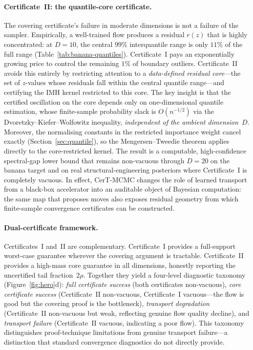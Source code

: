 \documentclass[12pt]{article}
\begin{document}
\paragraph{Certificate~II: the quantile-core certificate.}
The covering certificate's failure in moderate dimensions is not a failure of the sampler.
Empirically, a well-trained flow produces a residual $r(z)$ that is highly concentrated: at $D = 10$, the central $99\%$ interquantile range is only $11\%$ of the full range (Table~\ref{tab:banana-quantiles}).
Certificate~I pays an exponentially growing price to control the remaining $1\%$ of boundary outliers.
Certificate~II avoids this entirely by restricting attention to a \emph{data-defined residual core}---the set of $z$-values whose residuals fall within the central quantile range---and certifying the IMH kernel restricted to this core.
The key insight is that the certified oscillation on the core depends only on one-dimensional quantile estimation, whose finite-sample probability slack is $O(n^{-1/2})$ via the Dvoretzky--Kiefer--Wolfowitz inequality, \emph{independent of the ambient dimension~$D$}.
Moreover, the normalising constants in the restricted importance weight cancel exactly (Section~\ref{sec:quantile}), so the Mengersen--Tweedie theorem applies directly to the core-restricted kernel.
The result is a computable, high-confidence spectral-gap lower bound that remains non-vacuous through $D = 20$ on the banana target and on real structural-engineering posteriors where Certificate~I is completely vacuous.
In effect, CerT-MCMC changes the role of learned transport from a black-box accelerator into an auditable object of Bayesian computation: the same map that proposes moves also exposes residual geometry from which finite-sample convergence certificates can be constructed.

\paragraph{Dual-certificate framework.}
Certificates~I and~II are complementary.
Certificate~I provides a full-support worst-case guarantee wherever the covering argument is tractable.
Certificate~II provides a high-mass core guarantee in all dimensions, honestly reporting the uncertified tail fraction~$2\rho$.
Together they yield a four-level diagnostic taxonomy (Figure~\ref{fig:hero}d): \emph{full certificate success} (both certificates non-vacuous), \emph{core certificate success} (Certificate~II non-vacuous, Certificate~I vacuous---the flow is good but the covering proof is the bottleneck), \emph{transport degradation} (Certificate~II non-vacuous but weak, reflecting genuine flow quality decline), and \emph{transport failure} (Certificate~II vacuous, indicating a poor flow).
This taxonomy distinguishes proof-technique limitations from genuine transport failure---a distinction that standard convergence diagnostics do not directly provide.
\end{document}
